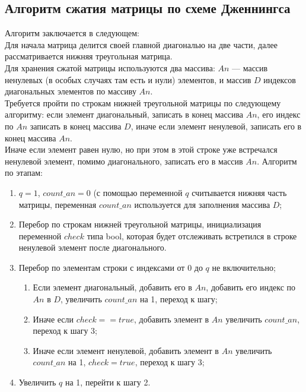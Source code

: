 \documentclass[12pt, a4paper]{article}
\begin{document}
\subsection{Алгоритм сжатия матрицы по схеме Дженнингса}
Алгоритм заключается в 
следующем: \\
Для начала матрица делится своей главной 
диагональю на две части, далее рассматривается
нижняя треугольная матрица. \\
Для хранения сжатой 
матрицы используются два массива: $An$ --- массив 
ненулевых (в особых случаях там есть и нули) 
элементов, и массив $D$ индексов диагональных 
элементов по массиву $An$. \\
Требуется пройти по
строкам нижней треугольной матрицы по следующему 
алгоритму: если элемент диагональный, записать в 
конец массива $An$, его индекс по $An$ записать в
конец массива $D$, иначе если элемент ненулевой,
записать его в конец массива $An$. \\
Иначе если 
элемент равен нулю, но при этом в этой строке уже 
встречался ненулевой элемент, помимо диагонального, 
записать его в массив $An$.
Алгоритм по этапам:
\begin{enumerate}
\item $q = 1$, $count\_an = 0$ (с помощью переменной 
$q$ считывается нижняя часть матрицы,
переменная $count\_an$ используется для заполнения 
массива $D$;
\item Перебор по строкам нижней треугольной матрицы, 
инициализация переменной $check$ типа bool, которая 
будет отслеживать встретился в строке ненулевой 
элемент после диагонального. 
\item Перебор по элементам строки с индексами от 0
до $q$ не включительно;
\begin{enumerate}
\item Если элемент диагональный, добавить его в 
$An$, добавить его индекс по $An$ в $D$, увеличить 
$count\_an$ на 1, переход к шагу;
\item Иначе если $check==true$, добавить элемент в 
$An$ увеличить $count\_an$, переход к шагу 3;
\item Иначе если элемент ненулевой, добавить элемент
в $An$ увеличить $count\_an$ на 1, $check=true$, 
переход к шагу 3;
\end{enumerate}
\item Увеличить $q$ на 1, перейти к шагу 2.
\end{enumerate}
\end{document}
